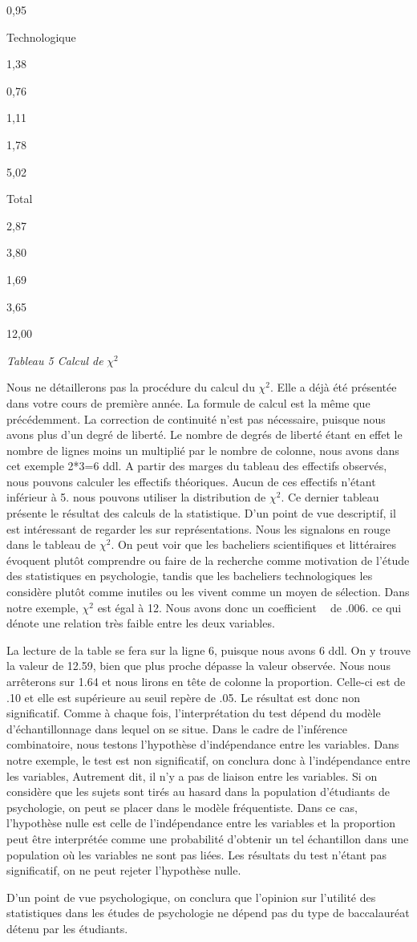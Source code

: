 \documentclass[]{book}
\theoremstyle{definition}
\theoremstyle{definition}
\theoremstyle{definition}
\theoremstyle{remark}
\begin{document}
0,95

Technologique

1,38

0,76

1,11

1,78

5,02

Total

2,87

3,80

1,69

3,65

12,00

\emph{Tableau 5 Calcul de} \(\chi ^{2}\)

Nous ne détaillerons pas la procédure du calcul du \(\chi ^{2}\). Elle a
déjà été présentée dans votre cours de première année. La formule de
calcul est la même que précédemment. La correction de continuité n'est
pas nécessaire, puisque nous avons plus d'un degré de liberté. Le nombre
de degrés de liberté étant en effet le nombre de lignes moins un
multiplié par le nombre de colonne, nous avons dans cet exemple 2*3=6
ddl. A partir des marges du tableau des effectifs observés, nous pouvons
calculer les effectifs théoriques. Aucun de ces effectifs n'étant
inférieur à 5. nous pouvons utiliser la distribution de \(\chi ^{2}\).
Ce dernier tableau présente le résultat des calculs de la statistique.
D'un point de vue descriptif, il est intéressant de regarder les sur
représentations. Nous les signalons en rouge dans le tableau de
\(\chi ^{2}\). On peut voir que les bacheliers scientifiques et
littéraires évoquent plutôt comprendre ou faire de la recherche comme
motivation de l'étude des statistiques en psychologie, tandis que les
bacheliers technologiques les considère plutôt comme inutiles ou les
vivent comme un moyen de sélection. Dans notre exemple, \(\chi ^{2}\)
est égal à 12. Nous avons donc un coefficient  de .006. ce qui dénote
une relation très faible entre les deux variables.

La lecture de la table se fera sur la ligne 6, puisque nous avons 6 ddl.
On y trouve la valeur de 12.59, bien que plus proche dépasse la valeur
observée. Nous nous arrêterons sur 1.64 et nous lirons en tête de
colonne la proportion. Celle-ci est de .10 et elle est supérieure au
seuil repère de .05. Le résultat est donc non significatif. Comme à
chaque fois, l'interprétation du test dépend du modèle d'échantillonnage
dans lequel on se situe. Dans le cadre de l'inférence combinatoire, nous
testons l'hypothèse d'indépendance entre les variables. Dans notre
exemple, le test est non significatif, on conclura donc à l'indépendance
entre les variables, Autrement dit, il n'y a pas de liaison entre les
variables. Si on considère que les sujets sont tirés au hasard dans la
population d'étudiants de psychologie, on peut se placer dans le modèle
fréquentiste. Dans ce cas, l'hypothèse nulle est celle de l'indépendance
entre les variables et la proportion peut être interprétée comme une
probabilité d'obtenir un tel échantillon dans une population où les
variables ne sont pas liées. Les résultats du test n'étant pas
significatif, on ne peut rejeter l'hypothèse nulle.

D'un point de vue psychologique, on conclura que l'opinion sur l'utilité
des statistiques dans les études de psychologie ne dépend pas du type de
baccalauréat détenu par les étudiants.


\end{document}
